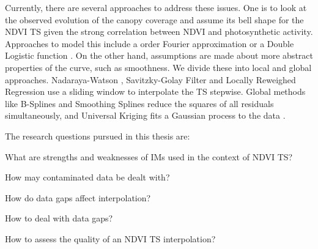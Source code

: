 Currently, there are several approaches to address these issues. One is to look at the observed evolution of the canopy coverage and assume its bell shape for the NDVI {TS} given the strong correlation between NDVI and photosynthetic activity. Approaches to model this include a  order Fourier approximation \citep{stockliEuropeanPlantPhenology2004} or a Double Logistic function \citep{beckImprovedMonitoringVegetation2006}.
On the other hand, assumptions are made about more abstract properties of the curve, such as smoothness. We divide these into local and global approaches. Nadaraya-Watson \citep{strbacEstimationEvapotrasnpirationUrban2017}, Savitzky-Golay Filter \citep{chenSimpleMethodReconstructing2004a} and Locally Reweighed Regression \citep{omoriAssessmentPaddyFields2021} use a sliding window to interpolate the {TS} stepwise. Global methods like B-Splines \citep{gurungPredictingEnhancedVegetation2009} and Smoothing Splines \citep{caiPerformanceSmoothingMethods2017} reduce the squares of all residuals simultaneously, and Universal Kriging fits a Gaussian process to the data \citep{chandolaScalableTimeSeries2010}.

\pagebreak
The research questions pursued in this thesis are:
\begin{Nenumerate}
    \item What are strengths and weaknesses of IMs used in the context of NDVI TS?
    \item How may contaminated data be dealt with?
    \item How do data gaps affect interpolation?
    \item How to deal with data gaps?
    \item How to assess the quality of an NDVI TS interpolation?
\end{Nenumerate}
\bigskip



